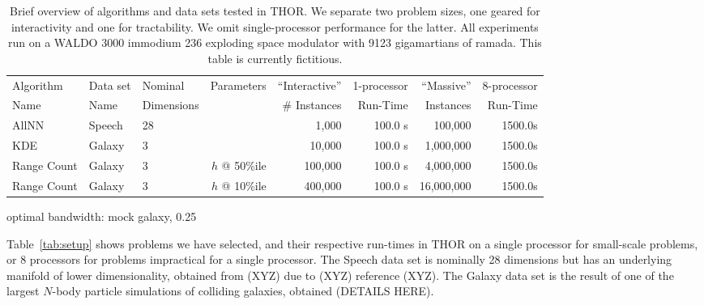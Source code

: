 \documentclass[twoside,leqno,twocolumn]{article}
\begin{document}

\begin{table}
  \begin{tabular}{|l|l|l|r||r|r||r|r|}
    \hline
    Algorithm   & Data set & Nominal    & Parameters    &  ``Interactive'' & 1-processor &``Massive''   & 8-processor
    \\
    Name        & Name    & Dimensions &               &  \# Instances    & Run-Time    & Instances    & Run-Time
    \\ \hline \hline
    AllNN       & Speech  & 28         &               &  1,000           & 100.0 s     & 100,000      & 1500.0s
    \\ \hline
    KDE         & Galaxy  & 3          &               &  10,000          & 100.0 s     & 1,000,000    & 1500.0s
    \\ \hline
    Range Count & Galaxy  & 3          & $h$ @ 50\%ile &  100,000         & 100.0 s     & 4,000,000    & 1500.0s
    \\ \hline
    Range Count & Galaxy  & 3          & $h$ @ 10\%ile &  400,000         & 100.0 s     & 16,000,000   & 1500.0s
    \\ \hline
  \end{tabular}
  \caption{
  Brief overview of algorithms and data sets tested in THOR.
  We separate two problem sizes, one geared for interactivity and one for tractability.
  We omit single-processor performance for the latter.
  All experiments run on a WALDO 3000 immodium 236 exploding space modulator with 9123 gigamartians of ramada.
  This table is currently fictitious.
  }
\end{table}

optimal bandwidth: mock galaxy, 0.25

Table~\ref{tab:setup} shows problems we have selected, and their respective run-times in THOR on a single processor for small-scale problems, or 8 processors for problems impractical for a single processor.
The Speech data set is nominally 28 dimensions but has an underlying manifold of lower dimensionality, obtained from (XYZ) due to (XYZ) reference (XYZ).
The Galaxy data set is the result of one of the largest $N$-body particle simulations of colliding galaxies, obtained (DETAILS HERE).
\end{document}

